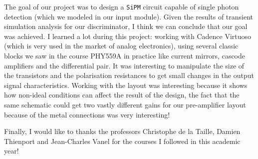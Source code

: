 \documentclass[a4paper,12pt,twoside]{article}
\begin{document}
	The goal of our project was to design a \texttt{SiPM} circuit capable of single photon detection (which we modeled in our input module). Given the results of transient simulation analysis for our discriminator, I think we can conclude that our goal was achieved. I learned a lot during this project: working with Cadence Virtuoso (which is very used in the market of analog electronics), using several classic blocks we saw in the course PHY559A in practice like current mirrors, cascode amplifiers and the differential pair. It was interesting to manipulate the size of the transistors and the polarisation resistances to get small changes in the output signal characteristics. Working with the layout was interesting because it shows how non-ideal conditions can affect the result of the design, the fact that the same schematic could get two vastly different gains for our pre-amplifier layout because of the metal connections was very interesting!
	
	Finally, I would like to thanks the professors Christophe de la Taille, Damien Thienport and Jean-Charles Vanel for the courses I followed in this academic year!
	
\end{document}
